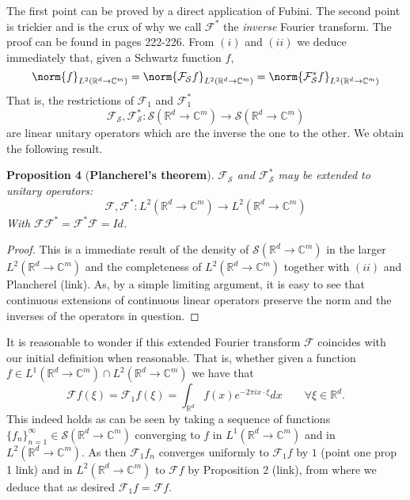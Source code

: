 \documentclass[
]{article}
\begin{document}
The first point can be proved by a direct application of Fubini. The
second point is trickier and is the crux of why we call
\(\mathcal{F}^*\) the \emph{inverse} Fourier transform. The proof can be
found in \cite{Tay} pages 222-226. From \((i)\) and \((ii)\) we deduce
immediately that, given a Schwartz function \(f\), \[\label{Plancherel}
    \norm{f}_{L^2({\mathbb R}^d\to\mathbb{C}^m)}=\norm{\mathcal{F}_\mathcal{S}f}_{L^2({\mathbb R}^d\to\mathbb{C}^m)}=\norm{\mathcal{F}_\mathcal{S}^*f}_{L^2({\mathbb R}^d\to\mathbb{C}^m)}\]
That is, the restrictions of \(\mathcal{F}_1\) and \(\mathcal{F}^*_1\)
\[\mathcal{F}_\mathcal{S},\mathcal{F}_\mathcal{S}^*:\mathcal{S}({\mathbb R}^d\to\mathbb{C}^m)\to\mathcal{S}({\mathbb R}^d\to\mathbb{C}^m)\]
are linear unitary operators which are the inverse the one to the other.
We obtain the following result.

\leavevmode{}%
\textbf{Proposition 4} (\textbf{Plancherel's theorem}).
\emph{\(\mathcal{F}_\mathcal{S}\) and \(\mathcal{F}_\mathcal{S}^*\) may
be extended to unitary operators:
\[\mathcal{F},\mathcal{F}^*:L^2({\mathbb R}^d\to\mathbb{C}^m)\to L^2({\mathbb R}^d\to\mathbb{C}^m)\]
With \(\mathcal{F}\mathcal{F}^*=\mathcal{F}^*\mathcal{F}=Id\).}

\emph{Proof.} This is a immediate result of the density of
\(\mathcal{S}({\mathbb R}^d\to\mathbb{C}^m)\) in the larger
\(L^2({\mathbb R}^d\to\mathbb{C}^m)\) and the completeness of
\(L^2({\mathbb R}^d\to\mathbb{C}^m)\) together with \((ii)\) and
Plancherel (link). As, by a simple limiting argument, it is easy to see
that continuous extensions of continuous linear operators preserve the
norm and the inverses of the operators in question.~◻

It is reasonable to wonder if this extended Fourier transform
\(\mathcal{F}\) coincides with our initial definition when reasonable.
That is, whether given a function
\(f \in L^1({\mathbb R}^d\to\mathbb{C}^m)\cap L^2({\mathbb R}^d\to\mathbb{C}^m)\)
we have that
\[\mathcal{F}f(\xi)=\mathcal{F}_1f(\xi)=\int_{{\mathbb R}^d}f(x)e^{-2\pi ix\cdot \xi} dx\qquad\forall \xi\in{\mathbb R}^d.\]
This indeed holds as can be seen by taking a sequence of functions
\(\lbrace f_n\rbrace_{n=1}^\infty\in{\mathcal S}({\mathbb R}^d\to\mathbb{C}^m)\)
converging to \(f\) in \(L^1({\mathbb R}^d\to\mathbb{C}^m)\) and in
\(L^2({\mathbb R}^d\to\mathbb{C}^m)\). As then \(\mathcal{F}_1 f_n\)
converges uniformly to \(\mathcal{F}_1f\) by \(1\) (point one prop 1
link) and in \(L^2({\mathbb R}^d\to\mathbb{C}^m)\) to \(\mathcal{F}f\)
by Proposition 2 (link), from where we deduce that as desired
\(\mathcal{F}_1f=\mathcal{F}f\).
\end{document}
